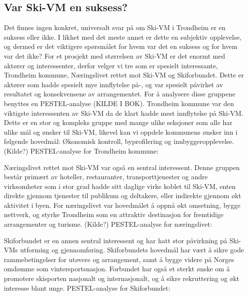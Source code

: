 \subsection{Var Ski-VM en suksess?}
Det finnes ingen konkret, universalt svar på om Ski-VM i Trondheim er en suksess eller ikke.  I likhet med det meste annet er dette en subjektiv opplevelse, og dermed er det viktigere spørsmålet for hvem var det en suksess og for hvem var det ikke? For et prosjekt med størrelsen av Ski-VM er det enormt med aktører og interessenter, derfor velger vi tre som er spesielt interessante, Trondheim kommune, Næringslivet rettet mot Ski-VM og Skiforbundet. Dette er aktører som hadde spesielt mye innflytelse på-, og var spesielt påvirket av resultatet og konsekvensene av arrangementet. For å analysere disse gruppene benyttes en PESTEL-analyse (KILDE I BOK).
 Trondheim kommune var den viktigste interessenten av Ski-VM da de klart hadde mest innflytelse på Ski-VM. Dette er en stor og kompleks gruppe med mange ulike seksjoner som alle har ulike mål og ønsker til Ski-VM, likevel kan vi oppdele kommunens ønsker inn i følgende hovedmål: Økonomisk kontroll, byprofilering og innbyggeropplevelse. (Kilde?)
PESTEL-analyse for Trondheim kommune:

Næringslivet rettet mot Ski-VM var også en sentral interessent. Denne gruppen består primært av hoteller, restauranter, transporttjenester og andre virksomheter som i stor grad hadde sitt daglige virke koblet til Ski-VM, enten direkte gjennom tjenester til publikum og deltakere, eller indirekte gjennom økt aktivitet i byen. For næringslivet var hovedmålet å oppnå økt omsetning, bygge nettverk, og styrke Trondheim som en attraktiv destinasjon for fremtidige arrangementer og turisme. (Kilde?)
PESTEL-analyse for næringslivet:


Skiforbundet er en annen sentral interessent og har hatt stor påvirkning på Ski-VMs utforming og gjennomføring. Skiforbundets hovedmål har vært å sikre gode rammebetingelser for utøvere og arrangement, samt å bygge videre på Norges omdømme som vintersportsnasjon. Forbundet har også et sterkt ønske om å promotere skisporten nasjonalt og internasjonalt, og å sikre rekruttering og økt interesse blant unge.
PESTEL-analyse for Skiforbundet:
